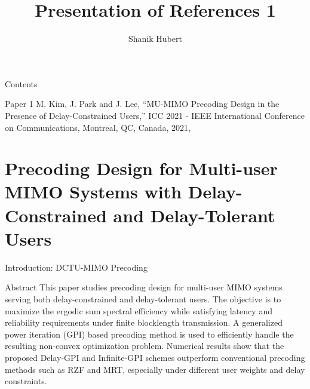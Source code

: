 \documentclass{beamer}
\title[Sample Presentation]{Presentation of References 1}
\author{Shanik Hubert}
\institute{}
\date{}
\begin{document}
\begin{frame}{}
    \titlepage
\end{frame}

\begin{frame}{Contents}
  \tableofcontents
\end{frame}

\begin{frame}{Paper 1}
M. Kim, J. Park and J. Lee, ``MU-MIMO Precoding Design in the Presence of Delay-Constrained Users,'' ICC 2021 - IEEE International Conference on Communications, Montreal, QC, Canada, 2021,
\end{frame}

\section{Precoding Design for Multi-user MIMO Systems with Delay-Constrained and Delay-Tolerant Users}

\begin{frame}{Introduction: DCTU-MIMO Precoding}

\begin{block}{Abstract}
This paper studies precoding design for multi-user MIMO systems serving both delay-constrained and delay-tolerant users. The objective is to maximize the ergodic sum spectral efficiency while satisfying latency and reliability requirements under finite blocklength transmission. A generalized power iteration (GPI) based precoding method is used to efficiently handle the resulting non-convex optimization problem. Numerical results show that the proposed Delay-GPI and Infinite-GPI schemes outperform conventional precoding methods such as RZF and MRT, especially under different user weights and delay constraints.
\end{block}

\end{frame}
\end{document}

